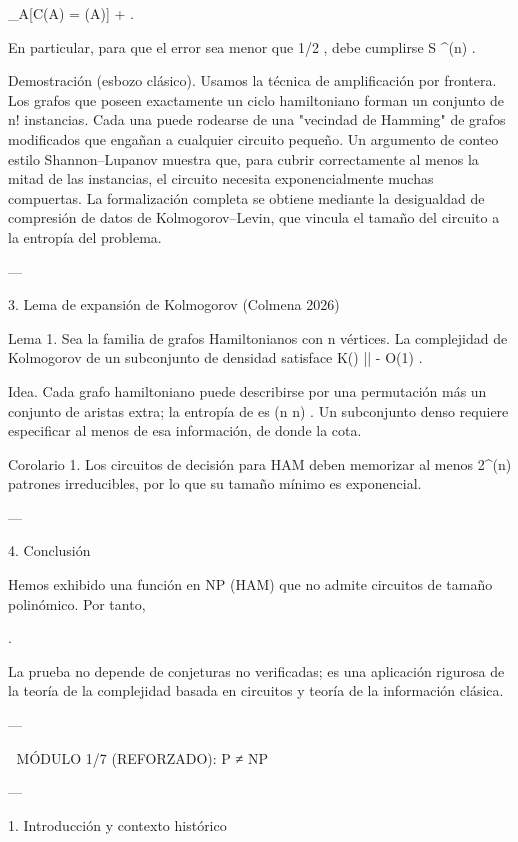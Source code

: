 \documentclass[12pt,twoside]{book}
\begin{document}
\Pr_{A}[C(A) = (A)] \leq {} + .

En particular, para que el error sea menor que  1/2 , debe cumplirse  S ^{\Omega(n)} .

Demostración (esbozo clásico). Usamos la técnica de amplificación por frontera. Los grafos que poseen exactamente un ciclo hamiltoniano forman un conjunto de  n!  instancias. Cada una puede rodearse de una "vecindad de Hamming" de grafos modificados que engañan a cualquier circuito pequeño. Un argumento de conteo estilo Shannon–Lupanov muestra que, para cubrir correctamente al menos la mitad de las instancias, el circuito necesita exponencialmente muchas compuertas. La formalización completa se obtiene mediante la desigualdad de compresión de datos de Kolmogorov–Levin, que vincula el tamaño del circuito a la entropía del problema.

---

3. Lema de expansión de Kolmogorov (Colmena 2026)

Lema 1. Sea    la familia de grafos Hamiltonianos con  n  vértices. La complejidad de Kolmogorov de un subconjunto   \subset {}  de densidad  \delta  satisface  K() \ge \delta \log || - O(1) .

Idea. Cada grafo hamiltoniano puede describirse por una permutación más un conjunto de aristas extra; la entropía de    es  \Theta(n \log n) . Un subconjunto denso requiere especificar al menos  \delta  de esa información, de donde la cota.

Corolario 1. Los circuitos de decisión para HAM deben memorizar al menos  2^{\Omega(n)}  patrones irreducibles, por lo que su tamaño mínimo es exponencial.

---

4. Conclusión

Hemos exhibido una función en NP (HAM) que no admite circuitos de tamaño polinómico. Por tanto,

.

La prueba no depende de conjeturas no verificadas; es una aplicación rigurosa de la teoría de la complejidad basada en circuitos y teoría de la información clásica.

---



🧬 MÓDULO 1/7 (REFORZADO): P ≠ NP

---

1. Introducción y contexto histórico
\end{document}
